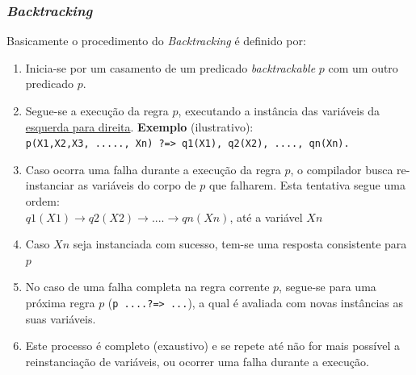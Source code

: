 
\begin{frame}[allowframebreaks=0.7]
\frametitle{\textit{Backtracking}}

Basicamente o procedimento do \textit{Backtracking} é definido por:

\begin{enumerate}

\item Inicia-se por  um casamento de um predicado \textit{backtrackable} $p$ com um outro predicado $p$.

\item Segue-se a execução da regra $p$, executando a instância das variáveis da \underline{esquerda para direita}.
 \textbf{Exemplo} (ilustrativo):\\
      \texttt{p(X1,X2,X3, ....., Xn) ?=> q1(X1), q2(X2), ...., qn(Xn).} 

\item Caso ocorra uma falha durante a execução da regra $p$,
 o compilador busca re-instanciar as variáveis do corpo de $p$ que falharem. Esta tentativa segue uma ordem:\\ 
  $q1(X1) \rightarrow q2(X2)\rightarrow ....\rightarrow qn(Xn)$, até a variável $Xn$

\item Caso $Xn$ seja instanciada com sucesso, tem-se uma resposta consistente para $p$

\item No caso de uma falha completa na regra corrente $p$, segue-se para uma próxima regra $p$
 (\texttt{p ....?=> ...}), a qual  é avaliada com novas instâncias as suas  variáveis.

\item Este processo é completo (exaustivo) e se repete até não for mais possível a reinstanciação de variáveis, ou ocorrer uma falha  durante a   execução.
\end{enumerate}
\end{frame}


